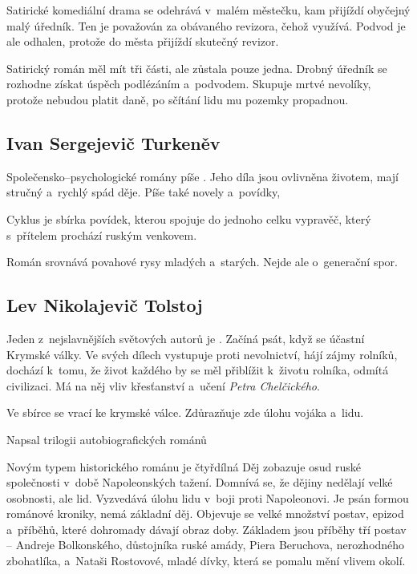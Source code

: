 Satirické komediální drama  se odehrává v~malém městečku,
kam přijíždí obyčejný malý úředník. Ten je považován za obávaného
revizora, čehož využívá. Podvod je ale odhalen, protože do města přijíždí
skutečný revizor.

Satirický román  měl mít tři části, ale zůstala pouze
jedna. Drobný úředník se rozhodne získat úspěch podlézáním a~podvodem.
Skupuje mrtvé nevolíky, protože nebudou platit daně, po sčítání lidu
mu pozemky propadnou.

\subsection*{Ivan Sergejevič Turkeněv}
Společensko--psychologické romány píše .
Jeho díla jsou ovlivněna životem, mají stručný a~rychlý spád děje.
Píše také novely a~povídky,  

Cyklus  je sbírka povídek, kterou spojuje 
do jednoho celku vypravěč, který s~přítelem prochází ruským venkovem.

Román  srovnává povahové rysy mladých a~starých.
Nejde ale o~generační spor.

\subsection*{Lev Nikolajevič Tolstoj}
Jeden z~nejslavnějších světových autorů je .
Začíná psát, když se účastní Krymské války. Ve svých dílech vystupuje proti
nevolnictví, hájí zájmy rolníků, dochází k~tomu, že život každého by se měl
přiblížit k~životu rolníka, odmítá civilizaci. Má na něj vliv křesťanství
a~učení \emph{Petra Chelčického}.

Ve sbírce  se vrací ke krymské válce.
Zdůrazňuje zde úlohu vojáka a~lidu.

Napsal trilogii autobiografických románů 

Novým typem historického románu je čtyřdílná  Děj zobazuje
osud ruské společnosti v~době Napoleonských tažení. Domnívá se, že dějiny
nedělají velké osobnosti, ale lid. Vyzvedává úlohu lidu v~boji proti Napoleonovi.
Je psán formou románové kroniky, nemá základní děj. Objevuje se velké množství
postav, epizod a~příběhů, které dohromady dávají obraz doby.
Základem jsou příběhy tří postav -- Andreje Bolkonského, důstojníka ruské amády,
Piera Beruchova, nerozhodného zbohatlíka, a~Nataši Rostovové, mladé dívky, která
se pomalu mění vlivem okolí.

